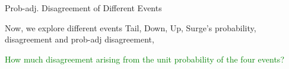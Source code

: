 \documentclass[11pt, aspectratio=169]{beamer}
\newenvironment{wideitemize}{\itemize\addtolength{\itemsep}{10pt}}{\enditemize}
\begin{document}
\begin{frame}{Prob-adj. Disagreement of Different Events}
    \begin{wideitemize}
    \item Now, we explore different events Tail, Down, Up, Surge's probability, disagreement and prob-adj disagreement,
    \item \textcolor{green}{How much disagreement arising from the unit probability of the four events?}
    \bigskip
    \end{wideitemize}
\end{frame}

\end{document}
